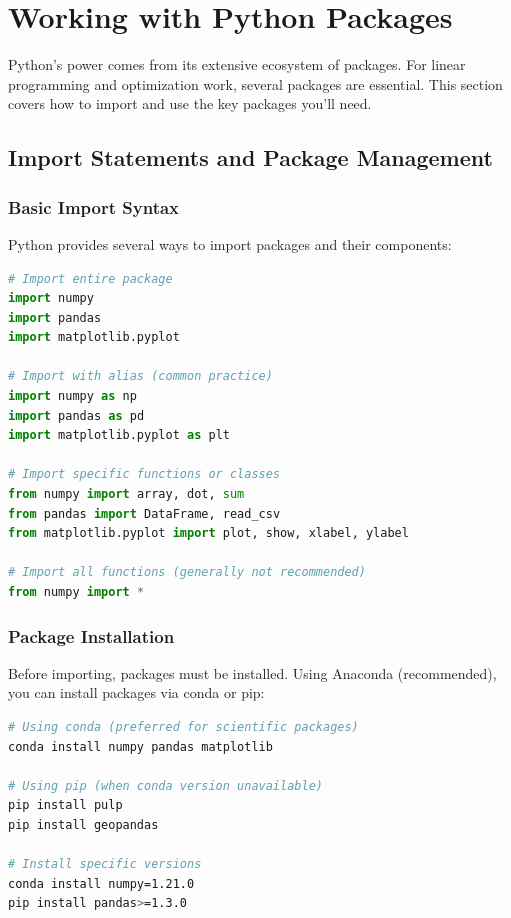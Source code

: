 \section{Working with Python Packages}

Python's power comes from its extensive ecosystem of packages. For linear programming and optimization work, several packages are essential. This section covers how to import and use the key packages you'll need.

\subsection{Import Statements and Package Management}

\subsubsection{Basic Import Syntax}
Python provides several ways to import packages and their components:

\begin{lstlisting}[language=Python]
# Import entire package
import numpy
import pandas
import matplotlib.pyplot

# Import with alias (common practice)
import numpy as np
import pandas as pd
import matplotlib.pyplot as plt

# Import specific functions or classes
from numpy import array, dot, sum
from pandas import DataFrame, read_csv
from matplotlib.pyplot import plot, show, xlabel, ylabel

# Import all functions (generally not recommended)
from numpy import *
\end{lstlisting}

\subsubsection{Package Installation}
Before importing, packages must be installed. Using Anaconda (recommended), you can install packages via conda or pip:

\begin{lstlisting}[language=bash]
# Using conda (preferred for scientific packages)
conda install numpy pandas matplotlib

# Using pip (when conda version unavailable)
pip install pulp
pip install geopandas

# Install specific versions
conda install numpy=1.21.0
pip install pandas>=1.3.0
\end{lstlisting}


